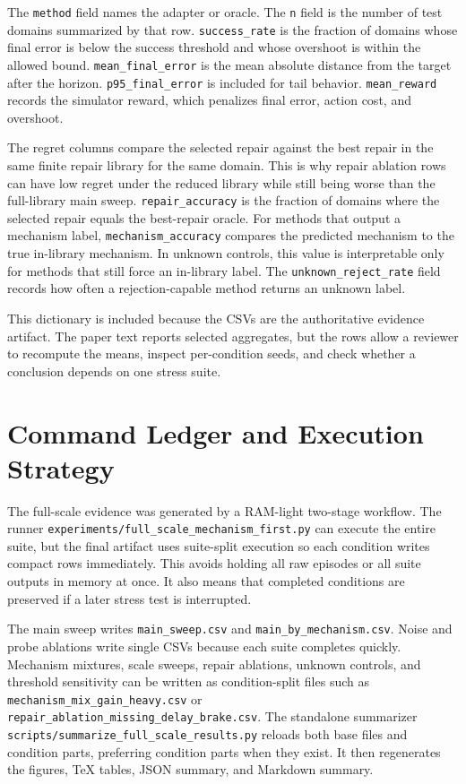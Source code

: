 \documentclass{article}
\begin{document}
The \texttt{method} field names the adapter or oracle. The \texttt{n} field is
the number of test domains summarized by that row. \texttt{success\_rate} is the
fraction of domains whose final error is below the success threshold and whose
overshoot is within the allowed bound. \texttt{mean\_final\_error} is the mean
absolute distance from the target after the horizon. \texttt{p95\_final\_error}
is included for tail behavior. \texttt{mean\_reward} records the simulator
reward, which penalizes final error, action cost, and overshoot.

The regret columns compare the selected repair against the best repair in the
same finite repair library for the same domain. This is why repair ablation rows
can have low regret under the reduced library while still being worse than the
full-library main sweep. \texttt{repair\_accuracy} is the fraction of domains
where the selected repair equals the best-repair oracle. For methods that output
a mechanism label, \texttt{mechanism\_accuracy} compares the predicted mechanism
to the true in-library mechanism. In unknown controls, this value is
interpretable only for methods that still force an in-library label. The
\texttt{unknown\_reject\_rate} field records how often a rejection-capable method
returns an unknown label.

This dictionary is included because the CSVs are the authoritative evidence
artifact. The paper text reports selected aggregates, but the rows allow a
reviewer to recompute the means, inspect per-condition seeds, and check whether
a conclusion depends on one stress suite.

\section{Command Ledger and Execution Strategy}

The full-scale evidence was generated by a RAM-light two-stage workflow. The
runner \texttt{experiments/full\_scale\_mechanism\_first.py} can execute the
entire suite, but the final artifact uses suite-split execution so each
condition writes compact rows immediately. This avoids holding all raw episodes
or all suite outputs in memory at once. It also means that completed conditions
are preserved if a later stress test is interrupted.

The main sweep writes \texttt{main\_sweep.csv} and
\texttt{main\_by\_mechanism.csv}. Noise and probe ablations write single CSVs
because each suite completes quickly. Mechanism mixtures, scale sweeps, repair
ablations, unknown controls, and threshold sensitivity can be written as
condition-split files such as \texttt{mechanism\_mix\_gain\_heavy.csv} or
\texttt{repair\_ablation\_missing\_delay\_brake.csv}. The standalone summarizer
\texttt{scripts/summarize\_full\_scale\_results.py} reloads both base files and
condition parts, preferring condition parts when they exist. It then regenerates
the figures, TeX tables, JSON summary, and Markdown summary.
\end{document}
